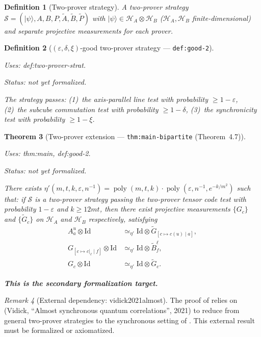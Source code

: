 \documentclass{article}
\providecommand{\uses}[1]{\par\smallskip\noindent\emph{Uses:} #1.\par\smallskip}
\providecommand{\notready}{\par\smallskip\noindent\emph{Status: not yet formalized.}\par\smallskip}
\newtheorem{definition}{Definition}[section]
\newtheorem{theorem}[definition]{Theorem}
\theoremstyle{remark}
\newtheorem{remark}[definition]{Remark}
\newcommand{\id}{\mathrm{Id}}
\newcommand{\hilb}{\mathcal{H}}
\newcommand{\eps}{\varepsilon}
\newcommand{\ket}[1]{\lvert #1 \rangle}
\begin{document}
\begin{definition}[Two-prover strategy]\label{def:two-prover-strat}
	A two-prover strategy
	$\mathcal{S}=(\ket{\psi},A,B,P,\tilde A,\tilde B,\tilde P)$ with
	$\ket{\psi}\in\hilb_A\otimes\hilb_B$
	($\hilb_A,\hilb_B$ finite-dimensional)
	and separate projective measurements for each prover.
\end{definition}

\begin{definition}[$(\eps,\delta,\xi)$-good two-prover strategy --- \texttt{def:good-2}]
	\label{def:good-2}
	\uses{def:two-prover-strat}
	\notready
	The strategy passes:
	(1)~the axis-parallel line test with probability $\ge 1-\eps$,
	(2)~the subcube commutation test with probability $\ge 1-\delta$,
	(3)~the synchronicity test with probability $\ge 1-\xi$.
\end{definition}

\begin{theorem}[Two-prover extension --- \texttt{thm:main-bipartite} (Theorem~4.7)]
	\label{thm:main-bipartite}
	\uses{thm:main, def:good-2}
	\notready
	There exists
	$\eta'(m,t,k,\eps,n^{-1})=\operatorname{poly}(m,t,k)\cdot\operatorname{poly}(\eps,n^{-1},e^{-k/m^2})$
	such that: if $\mathcal{S}$ is a two-prover strategy passing the two-prover
	tensor code test with probability $1-\eps$ and $k\ge 12mt$, then there
	exist projective measurements $\{G_c\}$ and $\{\tilde G_c\}$ on
	$\hilb_A$ and $\hilb_B$ respectively, satisfying
	\begin{align*}
		A^u_a\otimes\id                        & \simeq_{\eta'}\id\otimes\tilde G_{[c\mapsto c(u)\mid a]}, \\
		G_{[c\mapsto c|_\ell\mid f]}\otimes\id & \simeq_{\eta'}\id\otimes\tilde B^\ell_f,                  \\
		G_c\otimes\id                          & \simeq_{\eta'}\id\otimes\tilde G_c.
	\end{align*}

	\textbf{This is the secondary formalization target.}
\end{theorem}

\begin{remark}[External dependency: vidick2021almost]\label{rmk:bipartite-dep}
	The proof of  relies on
	\cite{vidick2021almost} (Vidick, ``Almost synchronous quantum correlations'',
	2021) to reduce from general two-prover strategies to the synchronous
	setting of . This external result must be formalized or
	axiomatized.
\end{remark}
\end{document}
